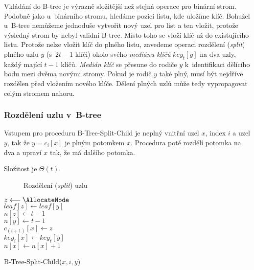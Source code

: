 Vkládání do B-tree je výrazně složitější než stejná operace pro binární
strom\@. Podobně jako u~binárního stromu, hledáme pozici listu,
kde uložíme klíč. Bohužel u~B-tree nemůžeme jednoduše vytvořit nový
uzel pro list a ten vložit, protože výsledný strom by nebyl validní
B-tree\@. Místo toho se vloží klíč už do existujícího listu\@. Protože
nelze vložit klíč do plného listu, zavedeme operaci rozdělení (\emph{split})
plného uzlu $y$ (s~$2t-1$ klíči) okolo svého \emph{mediánu klíčů}
$key_{t}[y]$ na dva uzly, každý mající $t-1$ klíčů\@. \emph{Medián
klíč} se přesune do rodiče $y$ k~identifikaci dělícího bodu mezi
dvěma novými stromy\@. Pokud je rodič $y$ také plný, musí být nejdříve
rozdělen před vložením nového klíče. Dělení plných uzlů může tedy
vypropagovat celým stromem nahoru.


\subsubsection{Rozdělení uzlu v~B-tree}

Vstupem pro proceduru B-Tree-Split-Child je neplný vnitřní uzel $x$,
index $i$ a uzel $y$, tak že $y=c_{i}[x]$ je plným potomkem $x$\@.
Procedura poté rozdělí potomka na dva a upraví $x$ tak, že má dalšího
potomka.

Složitost je $\Theta(t)$\@.

\begin{figure}[t]
\caption{Rozdělení (\emph{split}) uzlu}
\end{figure}


\begin{algorithm}[t]
\SetAlgoLined
{}

{$z \longleftarrow \AllocateNode$}\\
{$leaf[z] \longleftarrow leaf[y]$}\\
{$n[z] \longleftarrow t-1$}\\
$n[y] \longleftarrow t-1$\\
$c_{(i+1)}[x] \longleftarrow z$\\
$key_i[x] \longleftarrow key_t[y]$\\
$n[x] \longleftarrow n[x]+1$
\caption{B-Tree-Split-Child($x, i, y$)}
\end{algorithm}



